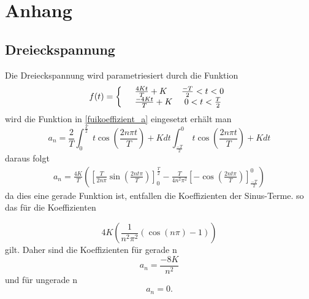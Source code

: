 \section{Anhang}
\label{Anhang}
\subsection{Dreieckspannung}
\label{sec:Dreieckspannung}
Die Dreieckspannung wird parametriesiert durch die Funktion
\begin{equation*}
  f(t)=\left\{
  \begin{array}{l l}
    &\frac{4Kt}{T}+K   \;\;\;\;\;\;\frac{-T}{2}<t<0 \\
    &\frac{-4Kt}{T}+K  \;\;\;\;\;0<t<\frac{T}{2}
  \end{array}
  \right.
\end{equation*}
wird die Funktion in \eqref{fuikoeffizient_a} eingesetzt erhält man
\begin{equation*}
  a_n=\frac{2}{T}\int^{\frac{T}{2}}_0 \;t \cos\left(\frac{2n \pi t}{T} \right) + K dt
  \int^0_{\frac{-T}{2}} \; t \cos\left(\frac{2n\pi t}{T} \right) + K dt
\end{equation*}
daraus folgt
\begin{align*}
  a_n=\frac{4K}{T}\left(\left[ \frac{T}{2n\pi}\sin(\frac{2nt\pi}{T})\right]
  ^\frac{T}{2}_0-\frac{T}{4n^2\pi^2}\left[-\cos\left(\frac{2nt\pi}{T}\right)
  \right]^0_\frac{-T}{2} \right)
\end{align*}
da dies eine gerade Funktion ist, entfallen die Koeffizienten der Sinus-Terme.
so das für die Koeffizienten

\begin{equation}
  4K\left(\frac{1}{n^2\pi^2}(\cos(n\pi)-1)\right)
\end{equation}
gilt. Daher sind die Koeffizienten für gerade n
\begin{equation*}
a_n=\frac{-8K}{n^2}
\end{equation*}
und für ungerade n
\begin{equation*}
  a_n=0.
\end{equation*}
